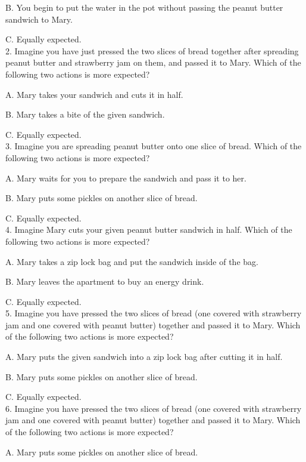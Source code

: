 \documentclass[12pt]{report}
\begin{document}
\begin{appendices}
B. You begin to put the water in the pot without passing the peanut butter sandwich to Mary.

C. Equally expected.\\


2. Imagine you have just pressed the two slices of bread together after spreading peanut butter and strawberry jam on them, and passed it to Mary. Which of the following two actions is more expected? 

A. Mary takes your sandwich and cuts it in half.

B. Mary takes a bite of the given sandwich.

C. Equally expected.\\


3. Imagine you are spreading peanut butter onto one slice of bread. Which of the following two actions is more expected?

A. Mary waits for you to prepare the sandwich and pass it to her.

B. Mary puts some pickles on another slice of bread.

C. Equally expected.\\


4. Imagine Mary cuts your given peanut butter sandwich in half. Which of the following two actions is more expected?

A. Mary takes a zip lock bag and put the sandwich inside of the bag.

B. Mary leaves the apartment to buy an energy drink.

C. Equally expected.\\


5. Imagine you have pressed the two slices of bread (one covered with strawberry jam and one covered with peanut butter) together and passed it to Mary. Which of the following two actions is more expected?

A. Mary puts the given sandwich into a zip lock bag after cutting it in half.

B. Mary puts some pickles on another slice of bread.

C. Equally expected.\\


6. Imagine you have pressed the two slices of bread (one covered with strawberry jam and one covered with peanut butter) together and passed it to Mary. Which of the following two actions is more expected?

A. Mary puts some pickles on another slice of bread.


\end{appendices}
\end{document}
